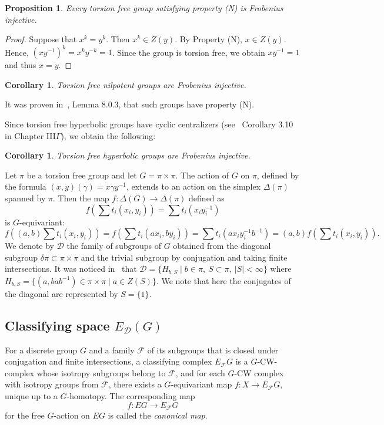 \documentclass{amsart}
\numberwithin{equation}{section}
\theoremstyle{plain}
\newtheorem{cor}[thm]{Corollary}
\newtheorem{prop}[thm]{Proposition}
\theoremstyle{definition}
\begin{document}
\begin{prop} 
Every torsion free group satisfying property (N)  is Frobenius injective.
\end{prop}
\begin{proof}
Suppose that $x^k=y^k$. Then $x^k\in Z(y)$. By Property (N), $x\in Z(y)$. Hence, $(xy^{-1})^k=x^ky^{-k}=1$. Since the group is torsion free, we obtain $xy^{-1}=1$ and
thus $x=y$.
\end{proof}
\begin{cor}
Torsion free nilpotent groups are Frobenius injective.
\end{cor}
It was proven in~\cite{FGLO}, Lemma 8.0.3, that such groups have property (N).

Since torsion free hyperbolic groups have cyclic centralizers (see~\cite{BH} Corollary 3.10 in Chapter III$\Gamma$), we obtain the following:
\begin{cor}
Torsion free hyperbolic groups are Frobenius injective.
\end{cor}



Let $\pi$ be a torsion free group and let $G=\pi\times\pi$. 
The action of $G$ on $\pi$, defined by the formula $(x,y)(\gamma)=x\gamma y^{-1}$, extends to an action on the simplex $\Delta(\pi)$ spanned by $\pi$.
Then the map
$f:\Delta(G)\to\Delta(\pi)$ defined as $$f(\sum t_i(x_i,y_i))=\sum t_i(x_iy_i^{-1})$$ is $G$-equivariant:
$$
f((a,b)\sum t_i(x_i,y_i))=f(\sum t_i(ax_i,by_i))=\sum t_i(ax_iy_i^{-1}b^{-1})=(a,b)f(\sum t_i(x_i,y_i)).$$
We denote by $\mathcal D$ the family of subgroups of $G$ obtained from the diagonal subgroup $\delta\pi\subset\pi\times\pi$ and the trivial subgroup by conjugation and taking finite intersections.   It was noticed in~\cite{FGLO} that 
$
\mathcal D=\{H_{b,S}\mid b\in\pi,\ S\subset\pi,\ |S|<\infty\}
$
where $H_{b,S}=\{(a,bab^{-1})\in\pi\times\pi\mid a\in Z(S)\}$. We note that here the conjugates of the diagonal are represented by $S=\{1\}$.

\subsection{Classifying space $E_{\mathcal D}(G)$}
For a discrete group $G$ and a family $\mathcal F$ of its subgroups that is closed under conjugation and finite intersections, a classifying complex $E_{\mathcal F}G$
is a $G$-CW-complex whose isotropy subgroups belong to $\mathcal F$, and for each $G$-CW complex with isotropy groups from $\mathcal F$, there exists a $G$-equivariant map $f:X\to E_{\mathcal F}G$, unique  up to a 
$G$-homotopy. 
 The corresponding map $$f:EG\to E_{\mathcal F}G$$
for the free $G$-action on $EG$ is 
called the {\em canonical map}.
\end{document}
